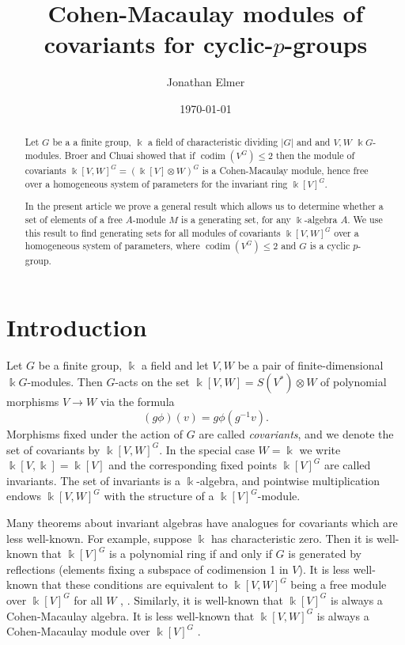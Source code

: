 \documentclass[a4paper]{amsart}
\title[Cohen-Macaulay covariants]{Cohen-Macaulay modules of covariants for cyclic-$p$-groups}
\author{Jonathan Elmer}
\date{\today}
\newcommand{\kk}{\Bbbk}
\def\codim{\operatorname{codim}}
\newtheorem*{Corollary of Conjecture}{Corollary of Conjecture}
\theoremstyle{definition}
\theoremstyle{remark}
\theoremstyle{Acknowledgments}
\begin{document}
\begin{abstract}

Let $G$ be a a finite group, $\kk$ a field of characteristic dividing $|G|$ and and $V,W$ $\kk G$-modules. Broer and Chuai \cite{BroerChuaiRelative} showed that if $\codim(V^G) \leq 2$ then the module of covariants $\kk[V,W]^G = (\kk[V] \otimes W)^G$ is a Cohen-Macaulay module, hence free over a homogeneous system of parameters for the invariant ring $\kk[V]^G$.

In the present article we prove a general result which allows us to determine whether a set of elements of a free $A$-module $M$ is a generating set, for any $\kk$-algebra $A$. We use this result to find generating sets for all modules of covariants $\kk[V,W]^G$ over a homogeneous system of parameters, where $\codim(V^G) \leq 2$ and $G$ is a cyclic $p$-group.
\end{abstract}

\maketitle

\section{Introduction}  

Let $G$ be a finite group, $\kk$ a field and let $V,W$ be a pair of finite-dimensional $\kk G$-modules. Then $G$-acts on the set $\kk[V,W] = S(V^*) \otimes W$ of polynomial morphisms $V \rightarrow W$ via the formula
\[(g \phi )(v) = g \phi (g^{-1} v). \]
Morphisms fixed under the action of $G$ are called \emph{covariants}, and we denote the set of covariants by $\kk[V,W]^G$. In the special case $W =\kk$ we write $\kk[V,\kk] = \kk[V]$ and the corresponding fixed points $\kk[V]^G$ are called invariants. The set of invariants is a $\kk$-algebra, and pointwise multiplication endows $\kk[V,W]^G$ with the structure of a $\kk[V]^G$-module.

Many theorems about invariant algebras have analogues for covariants which are less well-known. For example, suppose $\kk$ has characteristic zero. Then it is well-known that $\kk[V]^G$ is a polynomial ring if and only if $G$ is generated by reflections (elements fixing a subspace of codimension 1 in $V$). It is less well-known that these conditions are equivalent to $\kk[V,W]^G$ being a free module over $\kk[V]^G$ for all $W$ \cite{Chevalley}, \cite{SheppardTodd}. Similarly, it is well-known that $\kk[V]^G$ is always a Cohen-Macaulay algebra. It is less well-known that $\kk[V,W]^G$ is always a Cohen-Macaulay module over $\kk[V]^G$ \cite{HochsterEagon}.
\end{document}
